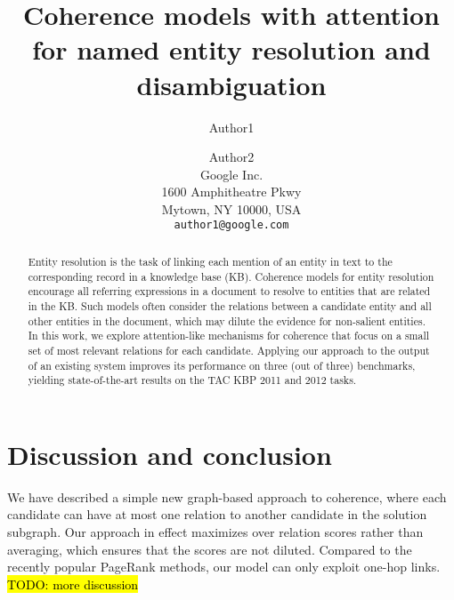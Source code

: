 \documentclass[11pt,letterpaper]{article}
\title{Coherence models with attention for named entity resolution and disambiguation}
\author{Author1 \and Author2\\
	    Google Inc. \\
	    1600 Amphitheatre Pkwy\\
	    Mytown, NY 10000, USA\\
	    {\tt author1@google.com}}
\date{}
\begin{document}
\maketitle

\begin{abstract}
Entity resolution is the task of linking each mention of an entity in text to the corresponding record in a knowledge base (KB). Coherence models for entity resolution encourage all referring expressions in a document to resolve to entities that are related in the KB. Such models often consider the relations between a candidate entity and all other entities in the document, which may dilute the evidence for non-salient entities. In this work, we explore attention-like mechanisms for coherence that focus on a small set of most relevant relations for each candidate.
 Applying our approach to the output of an existing system improves its performance on three (out of three) benchmarks, yielding state-of-the-art results on the TAC KBP 2011 and 2012 tasks.
\end{abstract}









\section{Discussion and conclusion}

We have described a simple new graph-based approach to coherence, where each candidate can have at most one relation to another candidate in the solution subgraph. Our approach in effect maximizes over relation scores rather than averaging, which ensures that the scores are not diluted. Compared to the recently popular PageRank methods, our model can only exploit one-hop links. \hl{TODO: more discussion}






\end{document}
